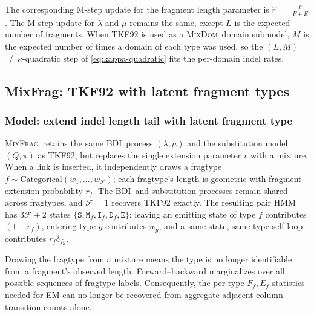 \documentclass[11pt]{article}
\newcommand{\MixFrag}{\textsc{MixFrag}}
\newcommand{\MixDom}{\textsc{MixDom}}
\newcommand{\BDI}{\textsc{BDI}}
\newcommand{\ins}{\lambda}
\newcommand{\del}{\mu}
\newcommand{\ext}{r}
\newcommand{\eqm}{\pi}
\newcommand{\hst}[1]{\texttt{#1}}
\begin{document}
The corresponding M-step update for the fragment length parameter is $\hat\ext \;=\; \frac{F}{F+E}$.  
The M-step update for $\lambda$ and $\mu$ remains the same, except $L$ is the expected number of fragments.  When TKF92 is used as a \MixDom\ domain submodel, $M$ is the
expected number of times a domain of each type was used, so the
$(L,M)$~/~$\kappa$-quadratic step of \eqref{eq:kappa-quadratic} fits the
per-domain indel rates.


\subsection{MixFrag: TKF92 with latent fragment types}
\label{sec:mixfrag}

\subsubsection{Model: extend indel length tail with latent fragment type}
\MixFrag\ retains the same \BDI\ process $(\ins,\del)$ and the substitution
model $(Q,\eqm)$ as TKF92, but replaces the single extension
parameter $\ext$ with a mixture. When a link is inserted, it independently draws
a fragtype $f\sim\mathrm{Categorical}(w_1,\dots,w_{\mathcal F})$; each fragtype's 
length is geometric with fragment-extension probability $r_f$.
The \BDI\ and substitution processes remain shared across fragtypes,
and $\mathcal F{=}1$ recovers TKF92 exactly. The resulting pair HMM has
$3\mathcal F{+}2$ states
$\{\hst{S},\hst{M}_f,\hst{I}_f,\hst{D}_f,\hst{E}\}$: leaving an emitting
state of type $f$ contributes $(1-r_f)$, entering type $g$ contributes
$w_g$, and a same-state, same-type self-loop contributes
$r_f\delta_{fg}$.

Drawing the fragtype from a mixture means the type is no longer identifiable 
from a fragment's observed length. Forward--backward marginalizes
over all possible sequences of fragtype labels. Consequently, the per-type
$F_f,E_f$ statistics needed for EM can no longer be recovered from 
aggregate adjacent-column transition counts alone.
\end{document}
